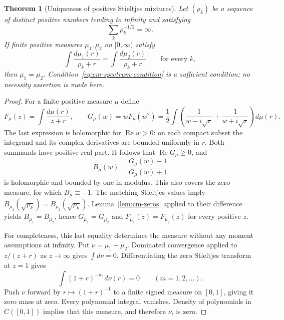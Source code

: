 \documentclass[11pt]{article}
\newtheorem{theorem}{Theorem}[section]
\theoremstyle{definition}
\theoremstyle{remark}
\numberwithin{equation}{section}
\begin{document}
\begin{theorem}[Uniqueness of positive Stieltjes mixtures]
\label{thm:cm-stieltjes}
Let $(\rho_k)$ be a sequence of distinct positive numbers tending to
infinity and satisfying
\begin{equation}\label{eq:cm-spectrum-condition}
 \sum_k\rho_k^{-1/2}=\infty.
\end{equation}
If finite positive measures $\mu_1,\mu_2$ on $[0,\infty)$ satisfy
\[
 \int\frac{d\mu_1(r)}{\rho_k+r}
 =\int\frac{d\mu_2(r)}{\rho_k+r}
 \qquad\text{for every }k,
\]
then $\mu_1=\mu_2$.  Condition~\eqref{eq:cm-spectrum-condition} is a
sufficient condition; no necessity assertion is made here.
\end{theorem}
\begin{proof}
For a finite positive measure $\mu$ define
\[
 F_\mu(z)=\int\frac{d\mu(r)}{z+r},\qquad
 G_\mu(w)=wF_\mu(w^2)
 =\frac12\int\left(\frac1{w-i\sqrt r}
                    +\frac1{w+i\sqrt r}\right)d\mu(r).
\]
The last expression is holomorphic for $\operatorname{Re}w>0$:
on each compact subset the integrand and its complex derivatives
are bounded uniformly in $r$.  Both summands have positive real part.
It follows that $\operatorname{Re}G_\mu\geq0$, and
\[
 B_\mu(w)=\frac{G_\mu(w)-1}{G_\mu(w)+1}
\]
is holomorphic and bounded by one in modulus.  This also covers the
zero measure, for which $B_\mu\equiv-1$.
The matching Stieltjes values imply
$B_{\mu_1}(\sqrt{\rho_k})=B_{\mu_2}(\sqrt{\rho_k})$.
Lemma~\ref{lem:cm-zeros} applied to their difference yields
$B_{\mu_1}=B_{\mu_2}$, hence $G_{\mu_1}=G_{\mu_2}$ and
$F_{\mu_1}(z)=F_{\mu_2}(z)$ for every positive $z$.

For completeness, this last equality determines the measure without
any moment assumptions at infinity.  Put $\nu=\mu_1-\mu_2$.
Dominated convergence applied to $z/(z+r)$ as $z\to\infty$ gives
$\int d\nu=0$.  Differentiating the zero Stieltjes transform at $z=1$
gives
\[
 \int (1+r)^{-m}\,d\nu(r)=0\qquad(m=1,2,\ldots).
\]
Push $\nu$ forward by $r\mapsto(1+r)^{-1}$ to a finite signed measure
on $[0,1]$, giving it zero mass at zero.  Every polynomial integral
vanishes.  Density of polynomials in $C([0,1])$ implies that this
measure, and therefore $\nu$, is zero.
\end{proof}
\end{document}
